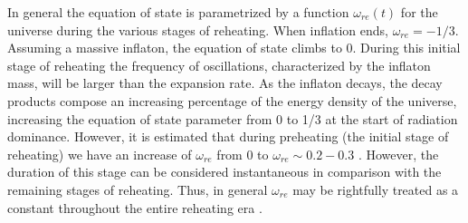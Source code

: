\documentclass[11pt,a4paper,twoside]{book}
\begin{document}
In general the equation of state is parametrized by a function $\omega_{re}(t)$ for the universe during the various stages of reheating. When inflation ends, $\omega_{re} = -1/3$. Assuming a massive inflaton, the equation of state climbs to 0. During this initial stage of reheating the frequency of oscillations, characterized by the inflaton mass, will be larger than the expansion rate. As the inflaton decays, the decay products compose an increasing percentage of the energy density of the universe,  increasing the equation of state parameter from 0 to 1/3 at the start of radiation dominance. However, it is estimated that during preheating (the initial stage of reheating) we have an increase of $ \omega_{re} $ from 0 to $\omega_{re} \sim 0.2-0.3$ \cite{Chap3:Podolsky_Felder}. However, the duration of this stage can be considered instantaneous in comparison with the remaining stages of reheating. Thus, in general $ \omega_{re} $ may be rightfully treated as a constant throughout the entire reheating era \cite{Chap3:Cook}.
\end{document}
